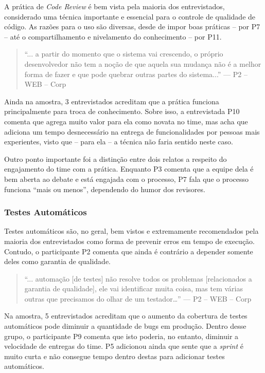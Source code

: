 A prática de \emph{Code Review} \cite{codeReview} é bem vista pela maioria dos entrevistados, considerado uma técnica importante e essencial para o controle de qualidade de código. As razões para o uso são diversas, desde de impor boas práticas -- por P7 -- até o compartilhamento e nivelamento do conhecimento -- por P11.

\begin{quote}
    ``... a partir do momento que o sistema vai crescendo, o próprio desenvolvedor não tem a noção de que aquela sua mudança não é a melhor forma de fazer e que pode quebrar outras partes do sistema...'' --- P2 -- WEB -- Corp
\end{quote}

Ainda na amostra, 3 entrevistados acreditam que a prática funciona principalmente para troca de conhecimento. Sobre isso, a entrevistada P10 comenta que agrega muito valor para ela como novata no time, mas acha que adiciona um tempo desnecessário na entrega de funcionalidades por pessoas mais experientes, visto que -- para ela -- a técnica não faria sentido neste caso.

Outro ponto importante foi a distinção entre dois relatos a respeito do engajamento do time com a prática. Enquanto P3 comenta que a equipe dela é bem aberta ao debate e está engajada com o processo, P7 fala que o processo funciona ``mais ou menos'', dependendo do humor dos revisores.

\subsubsection{Testes Automáticos}

Testes automáticos são, no geral, bem vistos e extremamente recomendados pela maioria dos entrevistados como forma de prevenir erros em tempo de execução. Contudo, o participante P2 comenta que ainda é contrário a depender somente deles como garantia de qualidade.

\begin{quote}
    ``... automação [de testes] não resolve todos os problemas [relacionados a garantia de qualidade], ele vai identificar muita coisa, mas tem várias outras que precisamos do olhar de um testador…'' --- P2 -- WEB -- Corp
\end{quote}

Na amostra, 5 entrevistados acreditam que o aumento da cobertura de testes automáticos pode diminuir a quantidade de bugs em produção. Dentro desse grupo, o participante P9 comenta que isto poderia, no entanto, diminuir a velocidade de entregas do time. P5 adicionou ainda que sente que a \emph{sprint} é muito curta e não consegue tempo dentro destas para adicionar testes automáticos.

